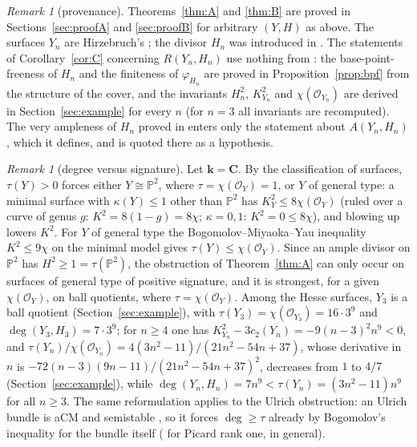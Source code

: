 \documentclass[11pt]{amsart}
\theoremstyle{remark}
\newtheorem{remark}[theorem]{Remark}
\theoremstyle{definition}
\newcommand{\PP}{\mathbb{P}}
\newcommand{\CC}{\mathbf{C}}
\newcommand{\bk}{\mathbf{k}}
\newcommand{\cO}{\mathcal{O}}
\begin{document}
\begin{remark}[provenance]\label{rem:imported}
Theorems~\ref{thm:A} and \ref{thm:B} are proved in Sections~\ref{sec:proofA} and \ref{sec:proofB} for arbitrary $(Y,H)$ as above. The surfaces $Y_n$ are Hirzebruch's \cite{Hi}; the divisor $H_n$ was introduced in \cite{An}. The statements of Corollary~\ref{cor:C} concerning $R(Y_n,H_n)$ use nothing from \cite{An}: the base-point-freeness of $H_n$ and the finiteness of $\varphi_{H_n}$ are proved in Proposition~\ref{prop:bpf} from the structure of the cover, and the invariants $H_n^2$, $K_{Y_n}^2$ and $\chi(\cO_{Y_n})$ are derived in Section~\ref{sec:example} for every $n$ (for $n=3$ all invariants are recomputed). The very ampleness of $H_n$ proved in \cite[Thm.~1.2]{An} enters only the statement about $A(Y_n,H_n)$, which it defines, and is quoted there as a hypothesis.
\end{remark}

\begin{remark}[degree versus signature]\label{rem:signature}
Let $\bk=\CC$. By the classification of surfaces, $\tau(Y)>0$ forces either $Y\cong\PP^2$, where $\tau=\chi(\cO_Y)=1$, or $Y$ of general type: a minimal surface with $\kappa(Y)\le1$ other than $\PP^2$ has $K_Y^2\le8\chi(\cO_Y)$ (ruled over a curve of genus $g$: $K^2=8(1-g)=8\chi$; $\kappa=0,1$: $K^2=0\le8\chi$), and blowing up lowers $K^2$. For $Y$ of general type the Bogomolov--Miyaoka--Yau inequality $K^2\le9\chi$ on the minimal model gives $\tau(Y)\le\chi(\cO_Y)$. Since an ample divisor on $\PP^2$ has $H^2\ge1=\tau(\PP^2)$, the obstruction of Theorem~\ref{thm:A} can only occur on surfaces of general type of positive signature, and it is strongest, for a given $\chi(\cO_Y)$, on ball quotients, where $\tau=\chi(\cO_Y)$. Among the Hesse surfaces, $Y_3$ is a ball quotient (Section~\ref{sec:example}), with $\tau(Y_3)=\chi(\cO_{Y_3})=16\cdot3^9$ and $\deg(Y_3,H_3)=7\cdot3^9$; for $n\ge4$ one has $K_{Y_n}^2-3c_2(Y_n)=-9(n-3)^2n^9<0$, and $\tau(Y_n)/\chi(\cO_{Y_n})=4(3n^2-11)/(21n^2-54n+37)$, whose derivative in $n$ is $-72(n-3)(9n-11)/(21n^2-54n+37)^2$, decreases from $1$ to $4/7$ (Section~\ref{sec:example}), while $\deg(Y_n,H_n)=7n^9<\tau(Y_n)=(3n^2-11)n^9$ for all $n\ge3$. The same reformulation applies to the Ulrich obstruction: an Ulrich bundle is aCM and semistable \cite[Thm.~2.9]{CHGS}, so it forces $\deg\ge\tau$ already by Bogomolov's inequality for the bundle itself (\cite{Be17} for Picard rank one, \cite{An} in general).
\end{remark}
\end{document}
